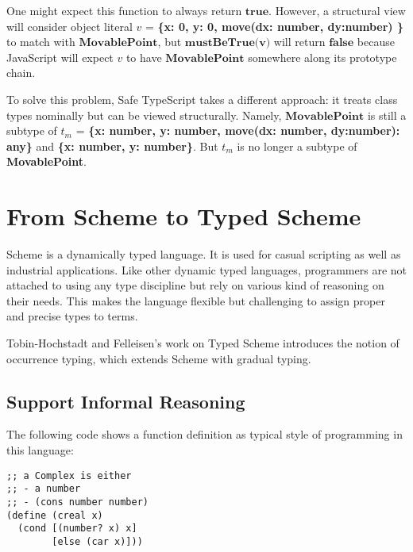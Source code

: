 One might expect this function to always return $\textbf{true}$.
However, a structural view will consider object literal
$v$ = \textbf{\{x: 0, y: 0, move(dx: number, dy:number) {}\}}
to match with $\textbf{MovablePoint}$, but $\textbf{mustBeTrue(v)}$
will return $\textbf{false}$ because JavaScript will expect $v$ to have
$\textbf{MovablePoint}$ somewhere along its prototype chain.

To solve this problem, Safe TypeScript takes a different approach:
it treats class types nominally but can be viewed structurally.
Namely, $\textbf{MovablePoint}$ is still a subtype of
$t_m$ = \textbf{\{x: number, y: number, move(dx: number, dy:number): any\}}
and \textbf{\{x: number, y: number\}}.
But $t_m$ is no longer a subtype of \textbf{MovablePoint}.




\section{From Scheme to Typed Scheme}

Scheme is a dynamically typed language.
It is used for casual scripting as well as industrial applications.
Like other dynamic typed languages, programmers are not attached to using any
type discipline but rely on various kind of reasoning on their needs.
This makes the language flexible but challenging to assign proper and precise types to terms.

Tobin-Hochstadt and Felleisen's work on Typed Scheme
introduces the notion of occurrence typing, which
extends Scheme with gradual typing.


\subsection{Support Informal Reasoning}

The following code shows a function definition as typical style of programming in this language:

\begin{verbatim}
;; a Complex is either
;; - a number
;; - (cons number number)
(define (creal x)
  (cond [(number? x) x]
        [else (car x)]))
\end{verbatim}

